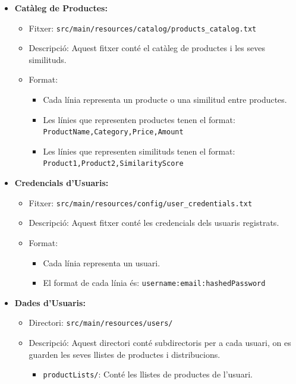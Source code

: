 \documentclass[a4paper, t]{article}
\begin{document}
\begin{itemize}
    \item \textbf{Catàleg de Productes:}
    \begin{itemize}
        \item Fitxer: \texttt{src/main/resources/catalog/products\_catalog.txt}
        \item Descripció: Aquest fitxer conté el catàleg de productes i les seves similituds.
        \item Format:
        \begin{itemize}
            \item Cada línia representa un producte o una similitud entre productes.
            \item Les línies que representen productes tenen el format: \texttt{ProductName,Category,Price,Amount}
            \item Les línies que representen similituds tenen el format: \texttt{Product1,Product2,SimilarityScore}
        \end{itemize}
    \end{itemize}
    \item \textbf{Credencials d'Usuaris:}
    \begin{itemize}
        \item Fitxer: \texttt{src/main/resources/config/user\_credentials.txt}
        \item Descripció: Aquest fitxer conté les credencials dels usuaris registrats.
        \item Format:
        \begin{itemize}
            \item Cada línia representa un usuari.
            \item El format de cada línia és: \texttt{username:email:hashedPassword}
        \end{itemize}
    \end{itemize}
    \item \textbf{Dades d'Usuaris:}
    \begin{itemize}
        \item Directori: \texttt{src/main/resources/users/}
        \item Descripció: Aquest directori conté subdirectoris per a cada usuari, on es guarden les seves llistes de productes i distribucions.
        \begin{itemize}
            \item \texttt{productLists/}: Conté les llistes de productes de l'usuari.
            \begin{itemize}

\end{itemize}
\end{itemize}
\end{itemize}
\end{itemize}
\end{document}
